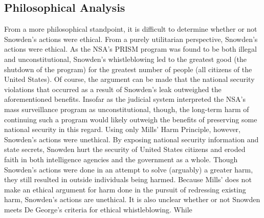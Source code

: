 \documentclass [12 pt] {article}
\begin{document}
\subsection {Philosophical Analysis}
From a more philosophical standpoint, it is difficult to determine whether or not Snowden's actions were ethical. From a purely utilitarian perspective, Snowden's actions were ethical. As the NSA's PRISM program was found to be both illegal and unconstitutional, Snowden's whistleblowing led to the greatest good (the shutdown of the program) for the greatest number of people (all citizens of the United States). Of course, the argument can be made that the national security violations that occurred as a result of Snowden's leak outweighed the aforementioned benefits. Insofar as the judicial system interpreted the NSA's mass surveillance program as unconstitutional, though, the long-term harm of continuing such a program would likely outweigh the benefits of preserving some national security in this regard.
\bigbreak
Using only Mills' Harm Principle, however, Snowden's actions were unethical. By exposing national security information and state secrets, Snowden hurt the security of United States citizens and eroded faith in both intelligence agencies and the government as a whole. Though Snowden's actions were done in an attempt to solve (arguably) a greater harm, they still resulted in outside individuals being harmed. Because Mills' does not make an ethical argument for harm done in the pursuit of redressing existing harm, Snowden's actions are unethical.
\bigbreak
It is also unclear whether or not Snowden meets De George's criteria for ethical whistleblowing. While 
\end{document}
